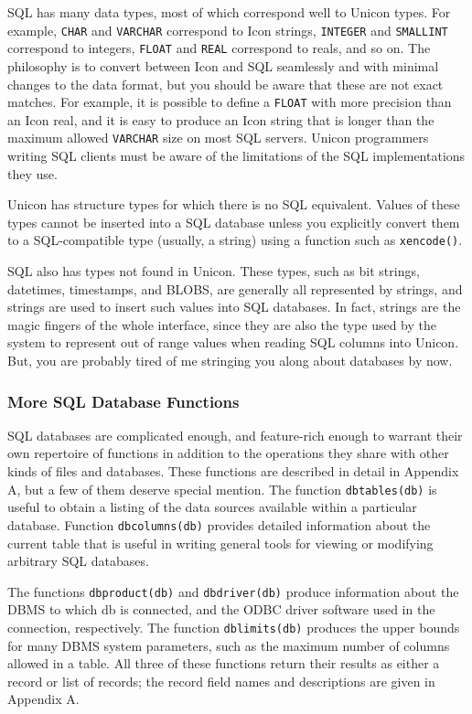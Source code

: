 SQL has many data types, most of which correspond well to Unicon types.
For example, \texttt{CHAR} and \texttt{VARCHAR} correspond to Icon
strings, \texttt{INTEGER} and \texttt{SMALLINT} correspond to integers,
\texttt{FLOAT} and \texttt{REAL} correspond to reals, and so on. The
philosophy is to convert between Icon and SQL seamlessly and with
minimal changes to the data format, but you should be aware that these
are not exact matches. For example, it is possible to define a
\texttt{FLOAT} with more precision than an Icon real, and it is easy to
produce an Icon string that is longer than the maximum allowed
\texttt{VARCHAR} size on most SQL servers. Unicon programmers writing
SQL clients must be aware of the limitations of the SQL implementations
they use.

Unicon has structure types for which there is no SQL equivalent. Values
of these types cannot be inserted into a SQL database unless you
explicitly convert them to a SQL-compatible type (usually, a string)
using a function such as \texttt{xencode()}.

SQL also has types not found in Unicon. These types, such as bit
strings, datetimes, timestamps, and BLOBS, are generally all
represented by strings, and strings are used to insert such values into
SQL databases. In fact, strings are the {\textquotedbl}magic
fingers{\textquotedbl} of the whole interface, since they are also the
type used by the system to represent out of range values when reading
SQL columns into Unicon. But, you are probably tired of me stringing
you along about databases by now.

\subsubsection{More SQL Database Functions}

SQL databases are complicated enough, and feature-rich enough to warrant
their own repertoire of functions in addition to the operations they
share with other kinds of files and databases. These functions are
described in detail in Appendix A, but a few of them deserve special
mention. The function \texttt{dbtables(db)} is useful to obtain a
listing of the data sources available within a particular database.
Function \texttt{dbcolumns(db)} provides detailed information about the
current table that is useful in writing general tools for viewing or
modifying arbitrary SQL databases.

The functions \texttt{dbproduct(db)} and \texttt{dbdriver(db)} produce
information about the DBMS to which db is connected, and the
ODBC driver software used in the connection, respectively.
The function \texttt{dblimits(db)} produces the upper bounds for many
DBMS system parameters, such as the maximum number of columns allowed
in a table. All three of these functions return their results as either
a record or list of records; the record field names and descriptions
are given in Appendix A.

